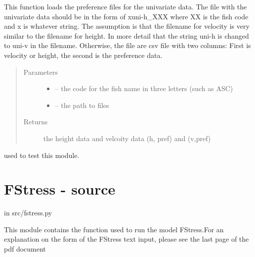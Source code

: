 \documentclass[letterpaper,10pt,english]{sphinxmanual}
\begin{document}
\begin{fulllineitems}
\label{\detokenize{index:src.stathab_c.load_pref_trop_uni}}
This function loads the preference files for the univariate data. The file with the univariate data should be in the
form of xuni-h\_XXX where XX is the fish code and x is whatever string. The assumption is that the filename for
velocity is very similar to the filename for height. In more detail that the string uni-h is changed to uni-v in
the filename. Otherwise, the file are csv file with two columns: First is velocity or height,
the second is the preference data.
\begin{quote}\begin{description}
\item[{Parameters}] \leavevmode\begin{itemize}
\item {} 
 -- the code for the fish name in three letters (such as ASC)

\item {} 
 -- the path to files

\end{itemize}

\item[{Returns}] \leavevmode
the height data and velcoity data (h, pref) and (v,pref)

\end{description}\end{quote}

\end{fulllineitems}


\begin{fulllineitems}
\label{\detokenize{index:src.stathab_c.main}}
used to test this module.

\end{fulllineitems}



\section{FStress - source}
\label{\detokenize{index:fstress-source}}
in src/fstress.py

This module contains the function used to run the model FStress.For an explanation on
the form of the FStress text input, please see the last page of the pdf document 
\label{\detokenize{index:module-src.fstress}}
\end{document}
